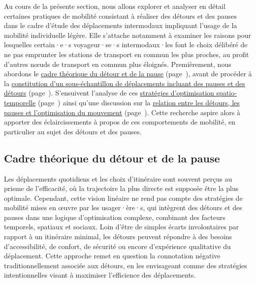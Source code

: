 \begin{refsegment}
Au cours de la présente section, nous allons explorer et analyser en détail certaines pratiques de mobilité consistant à réaliser des détours et des pauses dans le cadre d'étude des déplacements intermodaux impliquant l'usage de la mobilité individuelle légère. Elle s'attache notamment à examiner les raisons pour lesquelles certain·e·s voyageur·se·s intermodaux·les font le choix délibéré de ne pas emprunter les stations de transport en commun les plus proches, au profit d'autres nœuds de transport en commun plus éloignés. Premièrement, nous abordons le \hyperref[chap5:enjeux-detours-pauses]{cadre théorique du détour et de la pause} (page~\pageref{chap5:enjeux-detours-pauses}), avant de procéder à la \hyperref[chap5:methodes-statistiques]{constitution d'un sous-échantillon de déplacements incluant des pauses et des détours} (page~\pageref{chap5:methodes-statistiques}). S'ensuivent l'analyse de ces \hyperref[chap5:strategies-optimisation]{stratégies d'optimisation spatio-temporelle} (page~\pageref{chap5:strategies-optimisation}) ainsi qu'une discussion sur la \hyperref[chap5:discussion-detours-pauses-optimisation]{relation entre les détours, les pauses et l'optimisation du mouvement} (page~\pageref{chap5:discussion-detours-pauses-optimisation}). Cette recherche aspire alors à apporter des éclaircissements à propos de ces comportements de mobilité, en particulier au sujet des détours et des pauses.%

\subsection{Cadre théorique du détour et de la pause
    \label{chap5:enjeux-detours-pauses}
    }

Les déplacements quotidiens et les choix d'itinéraire sont souvent perçus au prisme de l'efficacité, où la trajectoire la plus directe est supposée être la plus optimale. Cependant, cette vision linéaire ne rend pas compte des stratégies de mobilité mises en œuvre par les usager·ère·s, qui intègrent des détours et des pauses dans une logique d’optimisation complexe, combinant des facteurs temporels, spatiaux et sociaux. Loin d’être de simples écarts involontaires par rapport à un itinéraire minimal, les détours peuvent répondre à des besoins d’accessibilité, de confort, de sécurité ou encore d’expérience qualitative du déplacement. Cette approche remet en question la connotation négative traditionnellement associée aux détours, en les envisageant comme des stratégies intentionnelles visant à maximiser l’efficience des déplacements.%


\end{refsegment}
